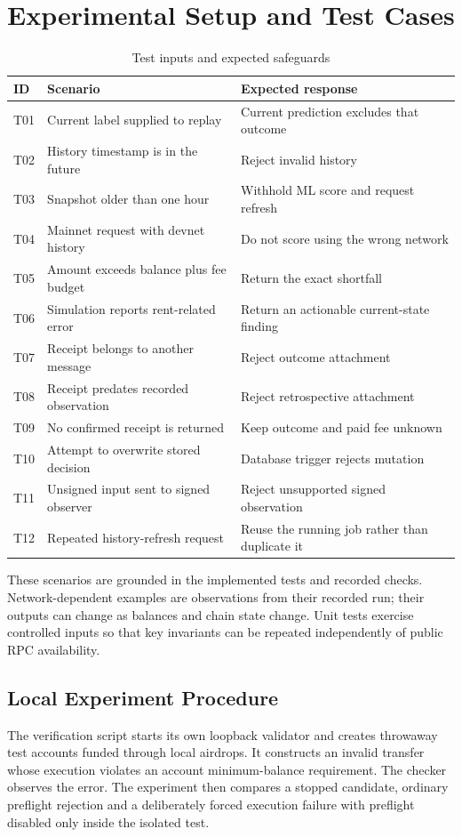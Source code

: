 \documentclass[12pt,a4paper,oneside]{report}
\begin{document}
\section{Experimental Setup and Test Cases}
\begin{table}[H]\centering\caption{Test inputs and expected safeguards}
\small\begin{tabularx}{\textwidth}{p{12mm}YY}\toprule ID&Scenario&Expected response\\\midrule
T01&Current label supplied to replay&Current prediction excludes that outcome\\
T02&History timestamp is in the future&Reject invalid history\\
T03&Snapshot older than one hour&Withhold ML score and request refresh\\
T04&Mainnet request with devnet history&Do not score using the wrong network\\
T05&Amount exceeds balance plus fee budget&Return the exact shortfall\\
T06&Simulation reports rent-related error&Return an actionable current-state finding\\
T07&Receipt belongs to another message&Reject outcome attachment\\
T08&Receipt predates recorded observation&Reject retrospective attachment\\
T09&No confirmed receipt is returned&Keep outcome and paid fee unknown\\
T10&Attempt to overwrite stored decision&Database trigger rejects mutation\\
T11&Unsigned input sent to signed observer&Reject unsupported signed observation\\
T12&Repeated history-refresh request&Reuse the running job rather than duplicate it\\\bottomrule\end{tabularx}\end{table}
These scenarios are grounded in the implemented tests and recorded checks. Network-dependent examples are observations from their recorded run; their outputs can change as balances and chain state change. Unit tests exercise controlled inputs so that key invariants can be repeated independently of public RPC availability.
\subsection{Local Experiment Procedure}
The verification script starts its own loopback validator and creates throwaway test accounts funded through local airdrops. It constructs an invalid transfer whose execution violates an account minimum-balance requirement. The checker observes the error. The experiment then compares a stopped candidate, ordinary preflight rejection and a deliberately forced execution failure with preflight disabled only inside the isolated test.
\end{document}
